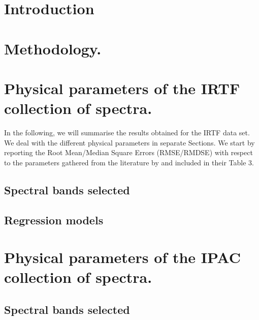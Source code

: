\documentclass[a4paper,fleqn,usenatbib]{mnras}
\begin{document}
%

\section{Introduction}
\label{sec:intro}







\section{Methodology.}
\label{sec:meth}


\section{Physical parameters of the IRTF collection of spectra.}
\label{sec:irtf}

In the following, we will summarise the results obtained for the IRTF
data set. We deal with the different physical parameters in separate
Sections. We start by reporting the Root Mean/Median Square Errors
(RMSE/RMDSE) with respect to the parameters gathered from the
literature by \cite{cesetti} and included in their Table 3.

\subsection{Spectral bands selected}

\subsection{Regression models}


\section{Physical parameters of the IPAC collection of spectra.}
\label{sec:ipac}

\subsection{Spectral bands selected}

\end{document}
